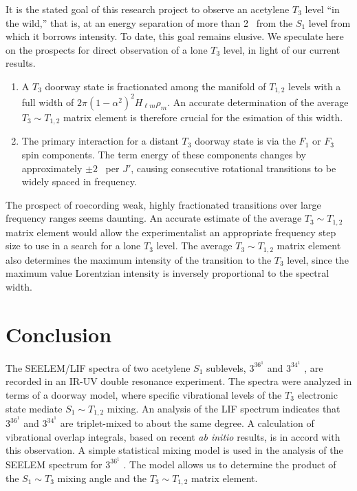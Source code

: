 It is the stated goal of this research project to observe an acetylene
$T_3$ level ``in the wild,'' that is, at an energy separation of more
than 2 \rcm\ from the $S_1$ level from which it borrows intensity.  To
date, this goal remains elusive.  We speculate here on the prospects
for direct observation of a lone $T_3$ level, in light of our current
results.
\begin{enumerate}
\item A $T_3$ doorway state is fractionated among the manifold of
  $T_{1,2}$ levels with a full width of $2 \pi (1-\alpha^2)^2 H_{\ell
    m} \rho_m$.  An accurate determination of the average $T_3 \sim
  T_{1,2}$ matrix element is therefore crucial for the esimation of
  this width.
\item The primary interaction for a distant $T_3$ doorway state is via
  the $F_1$ or $F_3$ spin components.  The term energy of these
  components changes by approximately $\pm 2$ \rcm\ per $J'$, causing
  consecutive rotational transitions to be widely spaced in frequency.
\end{enumerate}
The prospect of roecording weak, highly fractionated transitions over
large frequency ranges seems daunting.  An accurate estimate of the
average $T_3 \sim T_{1,2}$ matrix element would allow the
experimentalist an appropriate frequency step size to use in a search
for a lone $T_3$ level.  The average $T_3 \sim T_{1,2}$ matrix element
also determines the maximum intensity of the transition to the $T_3$
level, since the maximum value Lorentzian intensity is inversely
proportional to the spectral width.


\section{Conclusion}

The SEELEM/LIF spectra of two acetylene $S_1$ sublevels, $3^36^1$
 and $3^34^1$ , are recorded in an IR-UV double resonance
experiment.  The spectra were analyzed in terms of a doorway model,
where specific vibrational levels of the $T_3$ electronic state
mediate $S_1 \sim T_{1,2}$ mixing.  An analysis of the LIF spectrum
indicates that $3^36^1$  and $3^34^1$  are triplet-mixed
to about the same degree.  A calculation of vibrational overlap
integrals, based on recent \emph{ab initio} results, is in accord with
this observation.  A simple statistical mixing model is used in the
analysis of the SEELEM spectrum for $3^36^1$ .  The model allows
us to determine the product of the $S_1 \sim T_3$ mixing angle and the
$T_3 \sim T_{1,2}$ matrix element.


